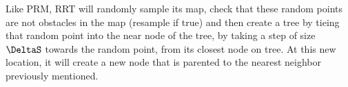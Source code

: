 Like PRM, RRT will randomly sample its map, check that these random points are not obstacles in the map (resample if true) and then create a tree by tieing that random point into the near node of the tree, by taking a step of size $\DeltaS$ towards the random point, from its closest node on tree. At this new location, it will create a new node that is parented to the nearest neighbor previously mentioned. 


